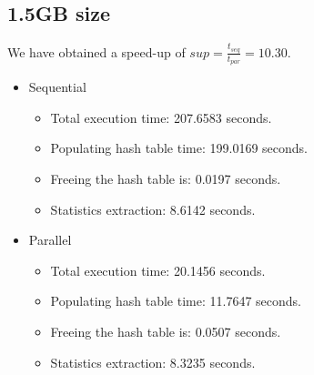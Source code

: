 \subsection{1.5GB size}
We have obtained a speed-up of $sup=\tfrac{t_{seq}}{t_{par}}=10.30$.
\begin{itemize}
    \item Sequential
    \begin{itemize}
        \item Total execution time: 207.6583 seconds.
        \item Populating hash table time: 199.0169 seconds.
        \item Freeing the hash table is: 0.0197 seconds.
        \item Statistics extraction: 8.6142 seconds.
    \end{itemize}
    \item Parallel
    \begin{itemize}
        \item Total execution time: 20.1456 seconds.
        \item Populating hash table time: 11.7647 seconds.
        \item Freeing the hash table is: 0.0507 seconds.
        \item Statistics extraction: 8.3235 seconds.
    \end{itemize}
\end{itemize}